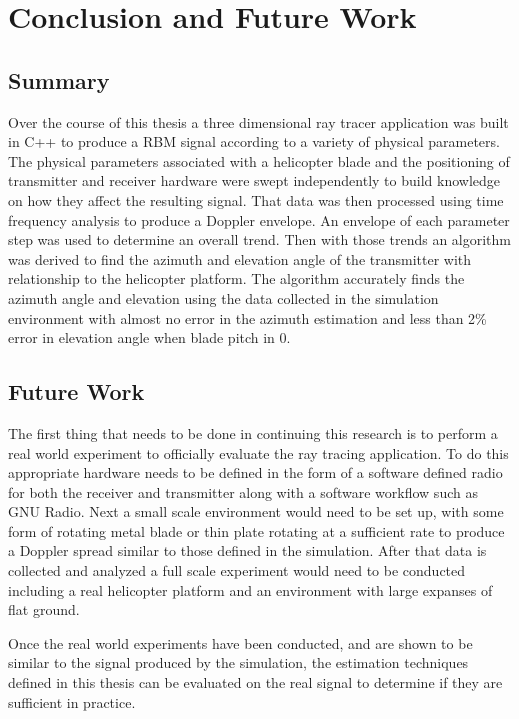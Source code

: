 \chapter{Conclusion and Future Work} \label{ch:conclusion}

\section{Summary}

Over the course of this thesis a three dimensional ray tracer application was built in C++ to produce a RBM signal according to a variety of physical parameters. The physical parameters associated with a helicopter blade and the positioning of transmitter and receiver hardware were swept independently to build knowledge on how they affect the resulting signal. That data was then processed using time frequency analysis to produce a Doppler envelope. An envelope of each parameter step was used to determine an overall trend. Then with those trends an algorithm was derived to find the azimuth and elevation angle of the transmitter with relationship to the helicopter platform. The algorithm accurately finds the azimuth angle and elevation using the data collected in the simulation environment with almost no error in the azimuth estimation and less than 2\% error in elevation angle when blade pitch in 0\textdegree.

\section{Future Work}
The first thing that needs to be done in continuing this research is to perform a real world experiment to officially evaluate the ray tracing application. To do this appropriate hardware needs to be defined in the form of a software defined radio for both the receiver and transmitter along with a software workflow such as GNU Radio. Next a small scale environment would need to be set up, with some form of rotating metal blade or thin plate rotating at a sufficient rate to produce a Doppler spread similar to those defined in the simulation. After that data is collected and analyzed a full scale experiment would need to be conducted including a real helicopter platform and an environment with large expanses of flat ground.

Once the real world experiments have been conducted, and are shown to be similar to the signal produced by the simulation, the estimation techniques defined in this thesis can be evaluated on the real signal to determine if they are sufficient in practice.

